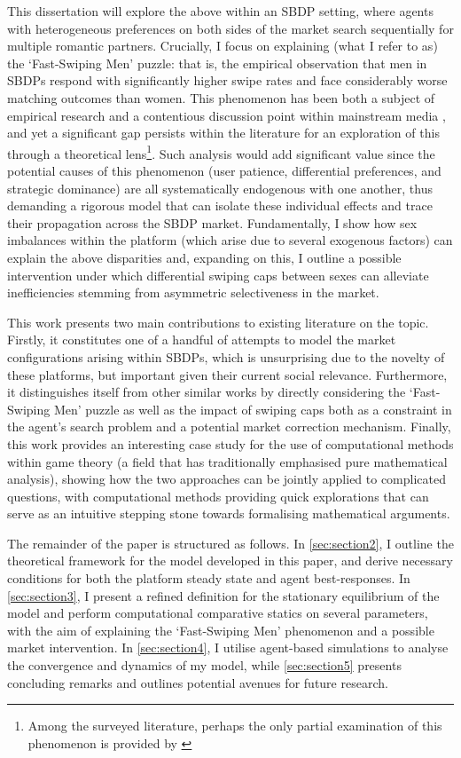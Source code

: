 This dissertation will explore the above within an SBDP setting, where agents with heterogeneous preferences on both sides of the market search sequentially for multiple romantic partners.
Crucially, I focus on explaining (what I refer to as) the `Fast-Swiping Men' puzzle: that is, the empirical observation that men in SBDPs respond with significantly higher swipe rates and face considerably worse matching outcomes than women. This phenomenon has been both a subject of empirical research \citep{tyson2016first} and a contentious discussion point within mainstream media \citep{web:vice_tindermen, web:wp_miserabletinder}, and yet a significant gap persists within the literature for an exploration of this through a theoretical lens\footnote{Among the surveyed literature, perhaps the only partial examination of this phenomenon is provided by \cite{kanoria2021facilitating}}. 
Such analysis would add significant value since the potential causes of this phenomenon (user patience, differential preferences, and strategic dominance) are all systematically endogenous with one another, thus demanding a rigorous model that can isolate these individual effects and trace their propagation across the SBDP market.
Fundamentally, I show how sex imbalances within the platform (which arise due to several exogenous factors) can explain the above disparities and, expanding on this, I outline a possible intervention under which differential swiping caps between sexes can alleviate inefficiencies stemming from asymmetric selectiveness in the market.

This work presents two main contributions to existing literature on the topic. 
Firstly, it constitutes one of a handful of attempts to model the market configurations arising within SBDPs, which is unsurprising due to the novelty of these platforms, but important given their current social relevance. 
Furthermore, it distinguishes itself from other similar works by directly considering the `Fast-Swiping Men' puzzle as well as the impact of swiping caps both as a constraint in the agent's search problem and a potential market correction mechanism.
Finally, this work provides an interesting case study for the use of computational methods within game theory (a field that has traditionally emphasised pure mathematical analysis), showing how the two approaches can be jointly applied to complicated questions, with computational methods providing quick explorations that can serve as an intuitive stepping stone towards formalising mathematical arguments.

The remainder of the paper is structured as follows. In \autoref{sec:section2}, I outline the theoretical framework for the model developed in this paper, and derive necessary conditions for both the platform steady state and agent best-responses. In \autoref{sec:section3}, I present a refined definition for the stationary equilibrium of the model and perform computational comparative statics on several parameters, with the aim of explaining the `Fast-Swiping Men' phenomenon and a possible market intervention. In \autoref{sec:section4}, I utilise agent-based simulations to analyse the convergence and dynamics of my model, while \autoref{sec:section5} presents concluding remarks and outlines potential avenues for future research.

